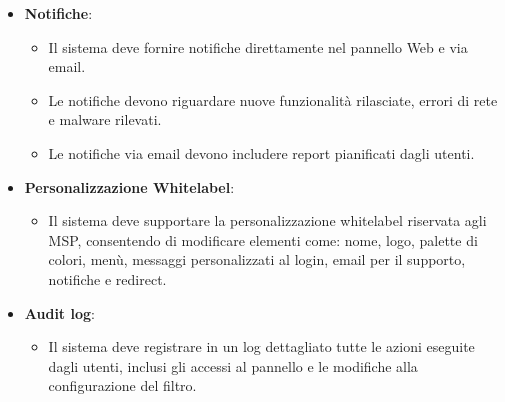 \begin{itemize}
  \item \textbf{Notifiche}:
    \begin{itemize}
      \item Il sistema deve fornire notifiche direttamente nel pannello Web e via email.
      \item Le notifiche devono riguardare nuove funzionalità rilasciate, errori di rete e malware rilevati.
      \item Le notifiche via email devono includere report pianificati dagli utenti.
    \end{itemize}

  \item \textbf{Personalizzazione Whitelabel}:
    \begin{itemize}
      \item Il sistema deve supportare la personalizzazione whitelabel riservata agli MSP, consentendo di modificare elementi come: nome, logo, palette di colori, menù, messaggi personalizzati al login, email per il supporto, notifiche e redirect.
    \end{itemize}

  \item \textbf{Audit log}:
    \begin{itemize}
      \item Il sistema deve registrare in un log dettagliato tutte le azioni eseguite dagli utenti, inclusi gli accessi al pannello e le modifiche alla configurazione del filtro.
    \end{itemize}
\end{itemize}

